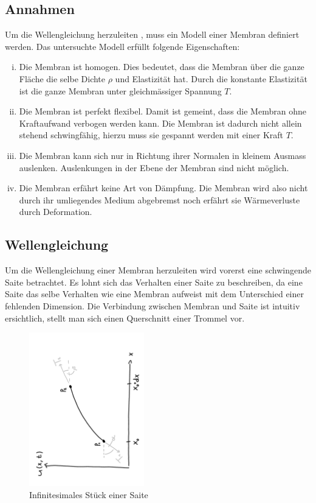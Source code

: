 \subsection{Annahmen} \label{kreimembran:annahmen}
Um die Wellengleichung herzuleiten \cite{kreismembran:wellengleichung_herleitung}, muss ein Modell einer Membran definiert werden. 
Das untersuchte Modell erfüllt folgende Eigenschaften:
\begin{enumerate}[i)]
	\item Die Membran ist homogen. 
	Dies bedeutet, dass die Membran über die ganze Fläche die selbe Dichte $ \rho $  und Elastizität hat. 
	Durch die konstante Elastizität ist die ganze Membran unter gleichmässiger Spannung $ T $.
	\item Die Membran ist perfekt flexibel. 
	Damit ist gemeint, dass die Membran ohne Kraftaufwand verbogen werden kann. 
	Die Membran ist dadurch nicht allein stehend schwingfähig, hierzu muss sie gespannt werden mit einer Kraft $ T $.
	\item Die Membran kann sich nur in Richtung ihrer Normalen in kleinem Ausmass auslenken.
	Auslenkungen in der Ebene der Membran sind nicht möglich.
	\item Die Membran erfährt keine Art von Dämpfung. 
	Die Membran wird also nicht durch ihr umliegendes Medium abgebremst noch erfährt sie Wärmeverluste durch Deformation.
	
\end{enumerate}

\subsection{Wellengleichung} Um die Wellengleichung einer Membran herzuleiten wird vorerst eine schwingende Saite betrachtet.
Es lohnt sich das Verhalten einer Saite zu beschreiben, da eine Saite das selbe Verhalten wie eine Membran aufweist mit dem Unterschied einer fehlenden Dimension.
Die Verbindung zwischen Membran und Saite ist intuitiv ersichtlich, stellt man sich einen Querschnitt einer Trommel vor.
\begin{figure}
	
	\begin{center}		
		\includegraphics[width=5cm,angle=-90]{papers/kreismembran/images/Saite.pdf}
		\caption{Infinitesimales Stück einer Saite}
		\label{kreismembran:im:Saite}
	\end{center}	
\end{figure}

